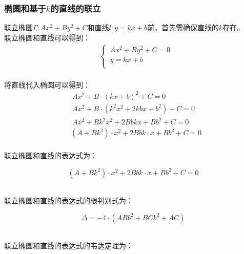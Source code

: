 \documentclass[UTF8]{ctexart}
\begin{document}
\subsubsection{椭圆和基于$k$的直线的联立}
    \setcounter{equation}{0}
    联立椭圆$\Gamma:Ax^2+By^2+C$和直线$l:y=kx+b$前，首先需确保直线的$k$存在。\\[3mm]
    联立椭圆和直线可以得到：
    \begin{align}
        &\begin{cases}
            ~Ax^2+By^2+C=0\\[1mm]
            ~y=kx+b\\[1mm]
        \end{cases}
    \end{align}\\[1mm]
    将直线代入椭圆可以得到：
    \begin{align}
        &~Ax^2+B\cdot(kx+b)^2+C=0\\[5mm]
        &~Ax^2+B\cdot\left(k^2x^2+2kbx+b^2\right)+C=0\\[5mm]
        &~Ax^2+Bk^2x^2+2Bbkx+Bb^2+C=0\\[5mm]
        &\left(A+Bk^2\right)\cdot x^2+2Bbk\cdot x+Bb^2+C=0
    \end{align}\\
    联立椭圆和直线的表达式为：
    \begin{large}
        \begin{equation*}
            \left(A+Bk^2\right)\cdot x^2+2Bbk\cdot x+Bb^2+C=0
        \end{equation*}
    \end{large}\\
    联立椭圆和直线的表达式的根判别式为：
    \begin{large}
        \begin{equation*}
            \Delta=-4\cdot\left(ABb^2+BCk^2+AC\right)
        \end{equation*}
    \end{large}\\
    联立椭圆和直线的表达式的韦达定理为：\vspace{8pt}
\end{document}
